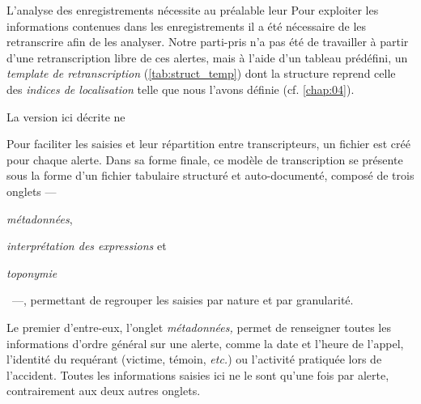 L'analyse des enregistrements nécessite au préalable leur 
Pour exploiter les informations contenues dans les enregistrements il
a été nécessaire de les retranscrire afin de les analyser.
%
Notre parti-pris n'a pas été de travailler à partir d'une
retranscription libre de ces alertes, mais à l'aide d'un tableau
prédéfini, un \emph{template de retranscription}
(\autoref{tab:struct_temp}) dont la structure reprend celle des
\emph{indices de localisation} telle que nous l'avons définie
(cf. \autoref{chap:04}).

La version ici décrite ne

Pour faciliter les saisies et leur répartition entre transcripteurs,
un fichier est créé pour chaque alerte.
%
Dans sa forme finale, ce modèle de transcription se présente sous la
forme d'un fichier tabulaire structuré et auto-documenté, composé de
trois onglets
%
---~\begin{enumerate*}[label=(\alph*)]
\item \emph{métadonnées},
\item \emph{interprétation des expressions} et
\item \emph{toponymie}
\end{enumerate*}~---,
%
permettant de regrouper les saisies par nature et par granularité.

Le premier d'entre-eux, l'onglet \emph{métadonnées,} permet de
renseigner toutes les informations d'ordre général sur une alerte,
comme la date et l'heure de l'appel, l'identité du requérant (victime,
témoin, \emph{etc.}) ou l’activité pratiquée lors de
l'accident. Toutes les informations saisies ici ne le sont qu'une fois
par alerte, contrairement aux deux autres onglets.

